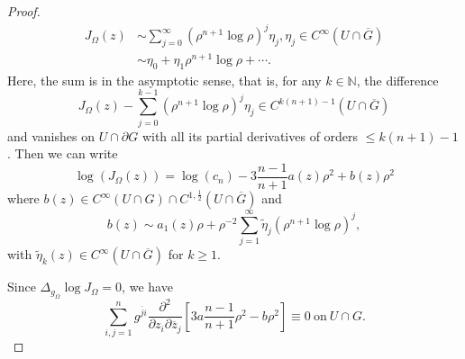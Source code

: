 \documentclass[a4paper,centertags,osxzneside,12pt]{amsart}
\numberwithin{equation}{section}
\begin{document}
\begin{proof}
\begin{equation}
\begin{split}
    J_{\Omega}(z)&\sim\sum_{j=0}^\infty(\rho^{n+1}\log\rho)^j\eta_j, \eta_j\in C^\infty(U\cap\overline G)\\
    &    \sim\eta_0+\eta_1\rho^{n+1}\log\rho+\cdots.
    \end{split}
\end{equation}
Here, the sum is in the asymptotic sense, that is, for any $k\in\mathbb N$, the difference $$J_\Omega(z)-\sum_{j=0}^{k-1}(\rho^{n+1}\log\rho)^j\eta_j\in C^{k(n+1)-1}(U\cap\overline G)$$ and vanishes on $U\cap\partial G$ with all its partial derivatives of orders $\leq k(n+1)-1$. 
Then we can write 
\begin{equation}
   \log( J_{\Omega}(z))=\log(c_n)-3\frac{n-1}{n+1}a(z)\rho^2+b(z)\rho^2
\end{equation}
where $b(z)\in C^\infty(U\cap G)\cap C^{1,\frac{1}{2}}(U\cap\overline G)$ and 
\begin{equation}\label{5-24-a1}
b(z)\sim a_1(z)\rho+\rho^{-2}\sum_{j=1}^\infty \tilde \eta_{j}(\rho^{n+1}\log\rho)^j,
\end{equation}
with $\tilde \eta_k(z)\in C^\infty(U\cap\overline G)$ for $k\ge 1.$








Since 
 $\Delta_{g_\Omega}\log J_{\Omega}=0$,  we have 
\begin{equation}\label{5-23-a3}
\sum_{i, j=1}^ng^{\overline ji}\frac{\partial^2}{\partial z_i\partial\overline z_j}[3a\frac{n-1}{n+1}\rho^2- b\rho^2]\equiv 0~\text{on} ~U\cap G.
\end{equation}


\end{proof}
\end{document}
